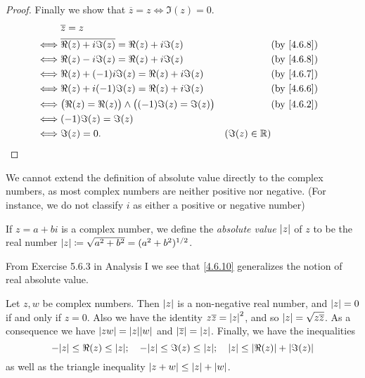 \begin{proof}
  Finally we show that \(\overline{z} = z \iff \Im(z) = 0\).
  \begin{align*}
         & \overline{z} = z                                                                              \\
    \iff & \overline{\Re(z) + i \Im(z)} = \Re(z) + i \Im(z)               &                 & \by{4.6.8} \\
    \iff & \Re(z) - i \Im(z) = \Re(z) + i \Im(z)                          &                 & \by{4.6.8} \\
    \iff & \Re(z) + (-1) i \Im(z) = \Re(z) + i \Im(z)                     &                 & \by{4.6.7} \\
    \iff & \Re(z) + i (-1) \Im(z) = \Re(z) + i \Im(z)                     &                 & \by{4.6.6} \\
    \iff & \big(\Re(z) = \Re(z)\big) \land \big((-1) \Im(z) = \Im(z)\big) &                 & \by{4.6.2} \\
    \iff & (-1) \Im(z) = \Im(z)                                                                          \\
    \iff & \Im(z) = 0.                                                    & (\Im(z) \in \R)
  \end{align*}
\end{proof}

\begin{note}
  We cannot extend the definition of absolute value directly to the complex numbers, as most complex numbers are neither positive nor negative.
  (For instance, we do not classify \(i\) as either a positive or negative number)
\end{note}

\begin{defn}\label{4.6.10}
  If \(z = a + bi\) is a complex number, we define the \emph{absolute value} \(\left\lvert z\right\rvert\) of \(z\) to be the real number \(\left\lvert z\right\rvert \coloneqq \sqrt{a^2 + b^2} = (a^2 + b^2)^{1 / 2}\).
\end{defn}

\begin{note}
  From Exercise 5.6.3 in Analysis I we see that \cref{4.6.10} generalizes the notion of real absolute value.
\end{note}

\begin{lem}\label{4.6.11}
  Let \(z, w\) be complex numbers.
  Then \(\left\lvert z\right\rvert\) is a non-negative real number, and \(\left\lvert z\right\rvert = 0\) if and only if \(z = 0\).
  Also we have the identity \(z \overline{z} = \left\lvert z\right\rvert^2\), and so \(\left\lvert z\right\rvert = \sqrt{z \overline{z}}\).
  As a consequence we have \(\abs{zw} = \abs{z} \abs{w}\) and \(\left\lvert\overline{z}\right\rvert = \left\lvert z\right\rvert\).
  Finally, we have the inequalities
  \[
    -\abs{z} \leq \Re(z) \leq \abs{z}; \quad -\abs{z} \leq \Im(z) \leq \abs{z}; \quad \abs{z} \leq \abs{\Re(z)} + \abs{\Im(z)}
  \]
  as well as the triangle inequality \(\left\lvert z + w\right\rvert \leq \left\lvert z\right\rvert + \left\lvert w\right\rvert\).
\end{lem}

